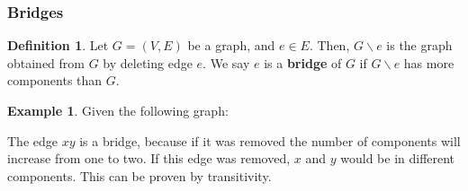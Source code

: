 \documentclass[]{article}
\theoremstyle{definition}
\newtheorem*{defn}{Definition}
\newtheorem{ex}{Example}[section]
\begin{document}
			\subsubsection{Bridges}
				\begin{defn}
					Let $G = (V, E)$ be a graph, and $e \in E$. Then, $G \backslash e$ is the graph obtained from $G$ by deleting edge $e$. We say $e$ is a \textbf{bridge} of $G$ if $G \backslash e$ has more components than $G$.
				\end{defn}

				\begin{ex}
					Given the following graph:
					\begin{center}
					\end{center}

					The edge $xy$ is a bridge, because if it was removed the number of components will increase from one to two. If this edge was removed, $x$ and $y$ would be in different components. This can be proven by transitivity.
				\end{ex}


	\newpage
\end{document}

